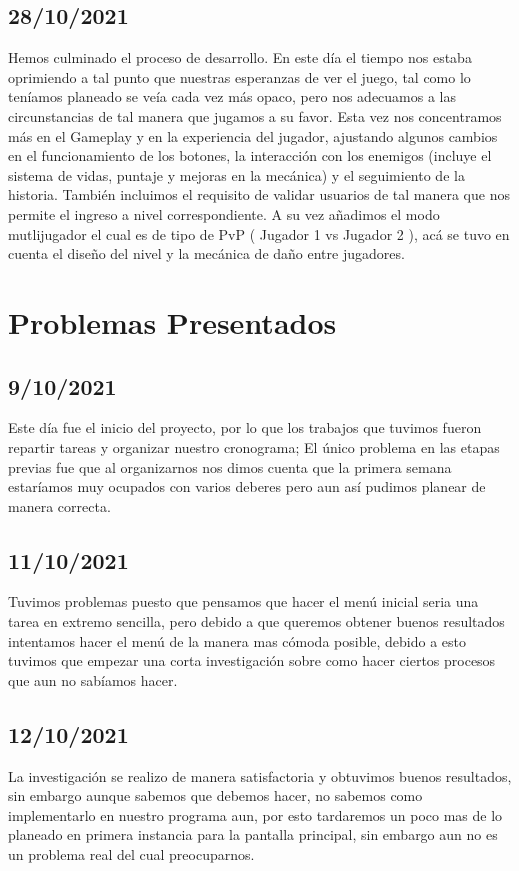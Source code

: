 \documentclass{article}
\begin{document}
    \subsection{28/10/2021}
    Hemos culminado el proceso de desarrollo. En este día el tiempo nos estaba oprimiendo a tal punto que nuestras esperanzas de ver el juego, tal como lo teníamos planeado se veía cada vez más opaco, pero nos adecuamos a las circunstancias de tal manera que jugamos a su favor. Esta vez nos concentramos más en el Gameplay y en la experiencia del jugador, ajustando algunos cambios en el funcionamiento de los botones, la interacción con los enemigos (incluye el sistema de vidas, puntaje y mejoras en la mecánica) y el seguimiento de la historia. También incluimos el requisito de validar usuarios de tal manera que nos permite el ingreso a nivel correspondiente. A su vez añadimos el modo mutlijugador el cual es de tipo de PvP ( Jugador 1 vs Jugador 2 ), acá se tuvo en cuenta el diseño del nivel y la mecánica de daño entre jugadores. 
    
\section{Problemas Presentados}
    \subsection{9/10/2021}
    Este día fue el inicio del proyecto, por lo que los trabajos que tuvimos fueron repartir tareas y organizar nuestro cronograma; El único problema en las etapas previas fue que al organizarnos nos dimos cuenta que la primera semana estaríamos muy ocupados con varios deberes pero aun así pudimos planear de manera correcta.

    \subsection{11/10/2021}
    Tuvimos problemas puesto que pensamos que hacer el menú inicial seria una tarea en extremo sencilla, pero debido a que queremos obtener buenos resultados intentamos hacer el menú de la manera mas cómoda posible, debido a esto tuvimos que empezar una corta investigación sobre como hacer ciertos procesos que aun no sabíamos hacer.
    
    \subsection{12/10/2021}
    La investigación se realizo de manera satisfactoria y obtuvimos buenos resultados, sin embargo aunque sabemos que debemos hacer, no sabemos como implementarlo en nuestro programa aun, por esto tardaremos un poco mas de lo planeado en primera instancia para la pantalla principal, sin embargo aun no es un problema real del cual preocuparnos.
    
\end{document}
